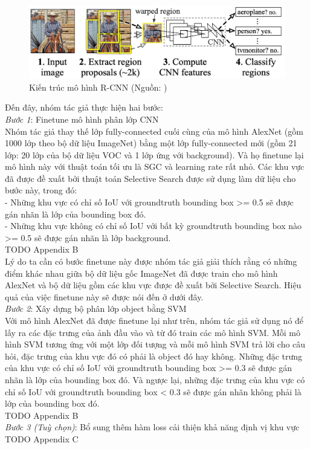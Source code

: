 {        \begin{figure}[H]
            \centering
            \includegraphics[width=13cm] {images/rcnn_model}
            \caption{Kiến trúc mô hình R-CNN (Nguồn: \cite{girshick2014rich})}
            \label{fig:rcnn_model}
        \end{figure}

        \noindent
        Đến đây, nhóm tác giả thực hiện hai bước: \\
        \textit{Bước 1}: Finetune mô hình phân lớp CNN \\
        Nhóm tác giả thay thế lớp fully-connected cuối cùng của mô hình AlexNet (gồm 1000 lớp theo bộ dữ liệu ImageNet) bằng một lớp fully-connected mới (gồm 21 lớp: 20 lớp của bộ dữ liệu VOC và 1 lớp ứng với background).
        Và họ finetune lại mô hình này với thuật toán tối ưu là SGC và learning rate rất nhỏ.
        Các khu vực đã được đề xuất bởi thuật toán Selective Search được sử dụng làm dữ liệu cho bước này, trong đó: \\
        - Những khu vực có chỉ số IoU với groundtruth bounding box >= 0.5 sẽ được gán nhãn là lớp của bounding box đó. \\
        - Những khu vực không có chỉ số IoU với bất kỳ groundtruth bounding box nào >= 0.5 sẽ được gán nhãn là lớp background. \\
        TODO Appendix B \\
        Lý do ta cần có bước finetune này được nhóm tác giả giải thích rằng có những điểm khác nhau giữa bộ dữ liệu gốc ImageNet đã được train cho mô hình AlexNet và bộ dữ liệu gồm các khu vực được đề xuất bởi Selective Search.
        Hiệu quả của việc finetune này sẽ được nói đến ở dưới đây. \\
        \textit{Bước 2}: Xây dựng bộ phân lớp object bằng SVM \\
        Với mô hình AlexNet đã được finetune lại như trên, nhóm tác giả sử dụng nó để lấy ra các đặc trưng của ảnh đầu vào và từ đó train các mô hình SVM.
        Mỗi mô hình SVM tương ứng với một lớp đối tượng và mỗi mô hình SVM trả lời cho câu hỏi, đặc trưng của khu vực đó có phải là object đó hay không.
        Những đặc trưng của khu vực có chỉ số IoU với groundtruth bounding box >= 0.3 sẽ được gán nhãn là lớp của bounding box đó.
        Và ngược lại, những đặc trưng của khu vực có chỉ số IoU với groundtruth bounding box < 0.3 sẽ được gán nhãn không phải là lớp của bounding box đó. \\
        TODO Appendix B \\
        \textit{Bước 3 (Tuỳ chọn)}: Bổ sung thêm hàm loss cải thiện khả năng định vị khu vực \\
        TODO Appendix C \\

}
